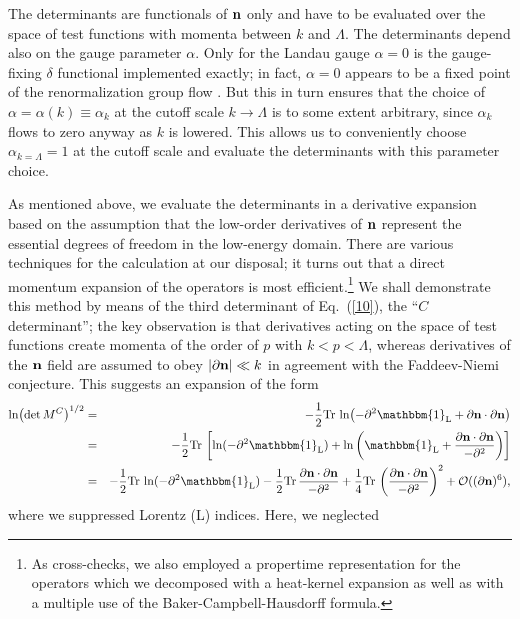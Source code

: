 \documentclass[a4paper,12pt]{article}
\newcommand{\Tr}{\text{Tr}}
\newcommand{\re}[1]{~(\ref{#1})}
\begin{document}
The determinants are functionals of $\mathbf{n}$ only and have to be
evaluated over the space of test functions with momenta between $k$
and $\Lambda$. The determinants depend also on the gauge parameter
$\alpha$. Only for the Landau gauge $\alpha=0$ is the gauge-fixing
$\delta$ functional implemented exactly; in fact, $\alpha=0$ appears
to be a fixed point of the renormalization group flow
\cite{Ellwanger:1996qf}. But this in turn ensures that the choice of
$\alpha=\alpha(k)\equiv\alpha_k$ at the cutoff scale $k\to\Lambda$ is
to some extent arbitrary, since $\alpha_k$ flows to zero anyway as $k$
is lowered. This allows us to conveniently choose
$\alpha_{k=\Lambda}=1$ at the cutoff scale and evaluate the
determinants with this parameter choice.

As mentioned above, we evaluate the determinants in a derivative
expansion based on the assumption that the low-order derivatives of
$\mathbf{n}$ represent the essential degrees of freedom in the low-energy
domain. There are various techniques for the calculation at our
disposal; it turns out that a direct momentum expansion of the
operators is most efficient.\footnote{As cross-checks, we also
  employed a propertime representation for the operators which we
  decomposed with a heat-kernel expansion as well as with a multiple
  use of the Baker-Campbell-Hausdorff formula.} We shall demonstrate
this method by means of the third determinant of Eq.\re{10}, the ``$C$
determinant''; the key observation is that derivatives acting on the
space of test functions create momenta of the order of $p$ with
$k<p<\Lambda$, whereas derivatives of the $\mathbf{n}$ field are assumed to
obey $|\partial\mathbf{n}| \ll k$ in agreement with the Faddeev-Niemi
conjecture. This suggests an expansion of the form
\begin{eqnarray}
\ln \bigl(\det M^C\bigr)^{1/2}&=& -\frac{1}{2} \Tr\, \ln \bigl(
-\partial^2 \mathbbm{1}_{\text{L}} +\partial\mn \cdot
\partial\mn\bigr)\nonumber\\
&=&-\frac{1}{2} \Tr\, \left[ \ln (-\partial^2\mathbbm{1}_{\text{L}})
  +\ln \left( \mathbbm{1}_{\text{L}} + \frac{\partial\mn\cdot
      \partial\mn}{-\partial^2} \right) \right]\label{11}\\
&=& -\frac{1}{2} \Tr\, \ln (-\partial^2\mathbbm{1}_{\text{L}})
-\frac{1}{2} \Tr\, \frac{\partial\mn\cdot \partial\mn}{-\partial^2}
+\frac{1}{4} \Tr\, \left(\frac{\partial\mn\cdot
    \partial\mn}{-\partial^2} \right)^2 + {\cal O}((\partial\mn)^6),
 \nonumber
\end{eqnarray}
where we suppressed Lorentz (L) indices. Here, we neglected
\end{document}
